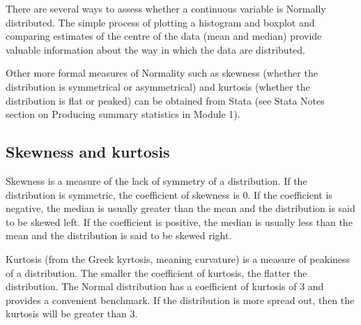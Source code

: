 \documentclass[
]{memoir}
\begin{document}
There are several ways to assess whether a continuous variable is Normally distributed. The simple process of plotting a histogram and boxplot and comparing estimates of the centre of the data (mean and median) provide valuable information about the way in which the data are distributed.

Other more formal measures of Normality such as skewness (whether the distribution is symmetrical or asymmetrical) and kurtosis (whether the distribution is flat or peaked) can be obtained from Stata (see Stata Notes section on Producing summary statistics in Module 1).

\hypertarget{skewness-and-kurtosis}{%
\subsection{Skewness and kurtosis}\label{skewness-and-kurtosis}}

Skewness is a measure of the lack of symmetry of a distribution. If the distribution is symmetric, the coefficient of skewness is 0. If the coefficient is negative, the median is usually greater than the mean and the distribution is said to be skewed left. If the coefficient is positive, the median is usually less than the mean and the distribution is said to be skewed right.

Kurtosis (from the Greek kyrtosis, meaning curvature) is a measure of peakiness of a distribution. The smaller the coefficient of kurtosis, the flatter the distribution. The Normal distribution has a coefficient of kurtosis of 3 and provides a convenient benchmark. If the distribution is more spread out, then the kurtosis will be greater than 3.

 
  \providecommand{\huxb}[2]{\arrayrulecolor[RGB]{#1}\global\arrayrulewidth=#2pt}
  \providecommand{\huxvb}[2]{\color[RGB]{#1}\vrule width #2pt}
  \providecommand{\huxtpad}[1]{\rule{0pt}{#1}}
  \providecommand{\huxbpad}[1]{\rule[-#1]{0pt}{#1}}
\end{document}
